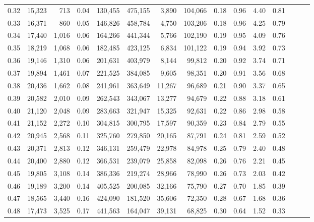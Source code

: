 \begin{tabular}{rrrrrrrrrrrrrrr}
0.32 &  15,323 &    713 &  0.04 &  130,455 &  475,155 &    3,890 &  104,066 &  0.18 &  0.96 &  4.40 &      0.81 \\
0.33 &  16,371 &    860 &  0.05 &  146,826 &  458,784 &    4,750 &  103,206 &  0.18 &  0.96 &  4.25 &      0.79 \\
0.34 &  17,440 &  1,016 &  0.06 &  164,266 &  441,344 &    5,766 &  102,190 &  0.19 &  0.95 &  4.09 &      0.76 \\
0.35 &  18,219 &  1,068 &  0.06 &  182,485 &  423,125 &    6,834 &  101,122 &  0.19 &  0.94 &  3.92 &      0.73 \\
0.36 &  19,146 &  1,310 &  0.06 &  201,631 &  403,979 &    8,144 &   99,812 &  0.20 &  0.92 &  3.74 &      0.71 \\
0.37 &  19,894 &  1,461 &  0.07 &  221,525 &  384,085 &    9,605 &   98,351 &  0.20 &  0.91 &  3.56 &      0.68 \\
0.38 &  20,436 &  1,662 &  0.08 &  241,961 &  363,649 &   11,267 &   96,689 &  0.21 &  0.90 &  3.37 &      0.65 \\
0.39 &  20,582 &  2,010 &  0.09 &  262,543 &  343,067 &   13,277 &   94,679 &  0.22 &  0.88 &  3.18 &      0.61 \\
0.40 &  21,120 &  2,048 &  0.09 &  283,663 &  321,947 &   15,325 &   92,631 &  0.22 &  0.86 &  2.98 &      0.58 \\
0.41 &  21,152 &  2,272 &  0.10 &  304,815 &  300,795 &   17,597 &   90,359 &  0.23 &  0.84 &  2.79 &      0.55 \\
0.42 &  20,945 &  2,568 &  0.11 &  325,760 &  279,850 &   20,165 &   87,791 &  0.24 &  0.81 &  2.59 &      0.52 \\
0.43 &  20,371 &  2,813 &  0.12 &  346,131 &  259,479 &   22,978 &   84,978 &  0.25 &  0.79 &  2.40 &      0.48 \\
0.44 &  20,400 &  2,880 &  0.12 &  366,531 &  239,079 &   25,858 &   82,098 &  0.26 &  0.76 &  2.21 &      0.45 \\
0.45 &  19,805 &  3,108 &  0.14 &  386,336 &  219,274 &   28,966 &   78,990 &  0.26 &  0.73 &  2.03 &      0.42 \\
0.46 &  19,189 &  3,200 &  0.14 &  405,525 &  200,085 &   32,166 &   75,790 &  0.27 &  0.70 &  1.85 &      0.39 \\
0.47 &  18,565 &  3,440 &  0.16 &  424,090 &  181,520 &   35,606 &   72,350 &  0.28 &  0.67 &  1.68 &      0.36 \\
0.48 &  17,473 &  3,525 &  0.17 &  441,563 &  164,047 &   39,131 &   68,825 &  0.30 &  0.64 &  1.52 &      0.33 \\

\end{tabular}
